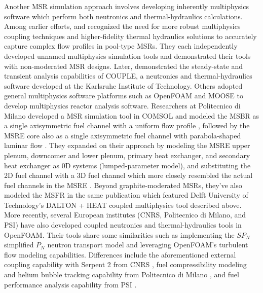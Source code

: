 Another \gls{MSR} simulation approach involves
developing inherently multiphysics software which perform both
neutronics and thermal-hydraulics calculations. Among earlier efforts,
\cite{nicolino_coupled_2008} and \cite{zhang_development_2009} recognized the
need for more robust multiphysics coupling techniques and higher-fidelity
thermal hydraulics solutions to accurately capture complex flow profiles in
pool-type \glspl{MSR}. They each independently developed unnamed multiphysics
simulation tools and demonstrated their tools with non-moderated \gls{MSR}
designs. Later, \cite{li_transient_2015} demonstrated the steady-state and
transient analysis capabilities of COUPLE, a neutronics and thermal-hydraulics
software developed at the Karlsruhe Institute of Technology. Others adopted
general multiphysics software platforms such as OpenFOAM
\cite{openfoam_openfoam_2021} and \gls{MOOSE} \cite{gaston_physics-based_2015}
to develop multiphysics reactor analysis software. Researchers at Politecnico
di Milano developed a \gls{MSR} simulation tool in COMSOL
\cite{comsol_ab_comsol_2018} and modeled the \gls{MSBR} as a single
axisymmetric fuel channel with a uniform flow profile
\cite{cammi_multi-physics_2011}, followed by the \gls{MSRE} core also as a
single axisymmetric fuel channel with parabola-shaped laminar flow
\cite{cammi_dimensional_2012}. They expanded on their approach by modeling the
\gls{MSRE} upper plenum, downcomer and lower plenum, primary heat exchanger,
and secondary heat exchanger as 0D systems (lumped-parameter model), and
substituting the 2D fuel channel with a 3D fuel channel which more closely
resembled the actual fuel channels in the \gls{MSRE}
\cite{zanetti_geometric_2015}. Beyond graphite-moderated \glspl{MSR}, they've
also modeled the \gls{MSFR} in the same publication which featured Delft
University of Technology's DALTON + HEAT coupled multiphysics tool described
above. More recently, several European institutes (\gls{CNRS}, Politecnico di
Milano, and \gls{PSI}) have also developed coupled neutronics and
thermal-hydraulics tools in OpenFOAM. Their tools share some
similarities such as implementing the $SP_N$ simplified $P_N$ neutron transport
model and leveraging OpenFOAM's turbulent flow modeling capabilities.
Differences include the aforementioned external coupling capability with
Serpent 2 from \gls{CNRS} \cite{blanco_neutronic_2020}, fuel
compressibility modeling and helium bubble tracking capability from Politecnico
di Milano \cite{cervi_development_2019}, and fuel performance analysis
capability from \gls{PSI} \cite{fiorina_creation_2018}.

